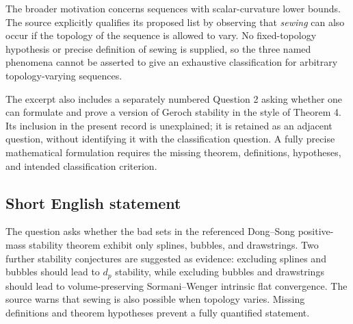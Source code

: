 \documentclass[11pt]{article}
\begin{document}
The broader motivation concerns sequences with scalar-curvature lower bounds. The source explicitly qualifies its proposed list by observing that \emph{sewing} can also occur if the topology of the sequence is allowed to vary. No fixed-topology hypothesis or precise definition of sewing is supplied, so the three named phenomena cannot be asserted to give an exhaustive classification for arbitrary topology-varying sequences.

The excerpt also includes a separately numbered Question 2 asking whether one can formulate and prove a version of Geroch stability in the style of Theorem 4. Its inclusion in the present record is unexplained; it is retained as an adjacent question, without identifying it with the classification question. A fully precise mathematical formulation requires the missing theorem, definitions, hypotheses, and intended classification criterion.
\subsection{Short English statement}
The question asks whether the bad sets in the referenced Dong--Song positive-mass stability theorem exhibit only splines, bubbles, and drawstrings. Two further stability conjectures are suggested as evidence: excluding splines and bubbles should lead to \(d_p\) stability, while excluding bubbles and drawstrings should lead to volume-preserving Sormani--Wenger intrinsic flat convergence. The source warns that sewing is also possible when topology varies. Missing definitions and theorem hypotheses prevent a fully quantified statement.
\end{document}
